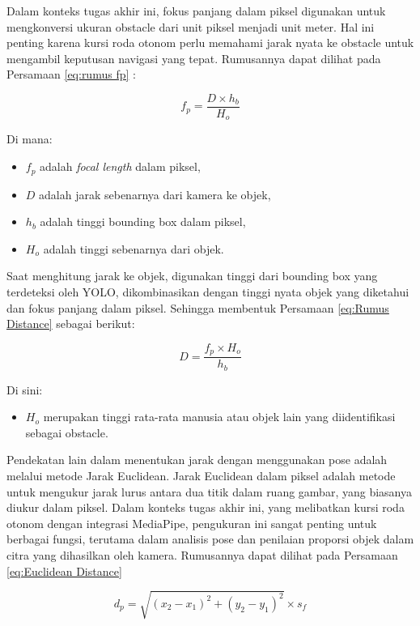 Dalam konteks tugas akhir ini, fokus panjang dalam piksel digunakan untuk mengkonversi ukuran obstacle dari unit piksel menjadi unit meter. Hal ini penting karena kursi roda otonom perlu memahami jarak nyata ke obstacle untuk mengambil keputusan navigasi yang tepat. Rumusannya dapat dilihat pada Persamaan \ref{eq:rumus fp} :

\begin{equation}
\label{eq:rumus fp}
f_p = \frac{D \times h_b}{H_o}
\end{equation}

Di mana:
\begin{itemize}
\item $f_p$ adalah \emph{focal length} dalam piksel,
\item $D$ adalah jarak sebenarnya dari kamera ke objek,
\item $h_b$ adalah tinggi bounding box dalam piksel,
\item $H_o$ adalah tinggi sebenarnya dari objek.
\end{itemize}

Saat menghitung jarak ke objek, digunakan tinggi dari bounding box yang terdeteksi oleh YOLO, dikombinasikan dengan tinggi nyata objek yang diketahui dan fokus panjang dalam piksel. Sehingga membentuk Persamaan \ref{eq:Rumus Distance} sebagai berikut:

\begin{equation}
\label{eq:Rumus Distance}
D = \frac{f_p \times H_o}{h_b}
\end{equation}

Di sini:
\begin{itemize}
\item $H_o$ merupakan tinggi rata-rata manusia atau objek lain yang diidentifikasi sebagai obstacle.
\end{itemize}

Pendekatan lain dalam menentukan jarak dengan menggunakan pose adalah melalui metode Jarak Euclidean. Jarak Euclidean dalam piksel adalah metode untuk mengukur jarak lurus antara dua titik dalam ruang gambar, yang biasanya diukur dalam piksel. Dalam konteks tugas akhir ini, yang melibatkan kursi roda otonom dengan integrasi MediaPipe, pengukuran ini sangat penting untuk berbagai fungsi, terutama dalam analisis pose dan penilaian proporsi objek dalam citra yang dihasilkan oleh kamera. Rumusannya dapat dilihat pada Persamaan \ref{eq:Euclidean Distance}

\begin{equation}
\label{eq:Euclidean Distance}
d_p = \sqrt{(x_2 - x_1)^2 + (y_2 - y_1)^2} \times s_f
\end{equation}

